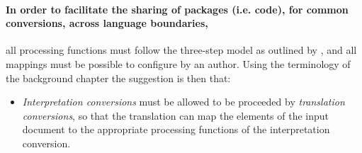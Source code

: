\documentclass{scrreprt}
\begin{document}
\paragraph{In order to facilitate the sharing of packages (i.e. code), for common conversions, across language boundaries, } all processing functions must follow the three-step model as outlined by \citet{goldfarb}, and all mappings must be possible to configure by an author. Using the terminology of the background chapter the suggestion is then that:

\begin{itemize}
\item \emph{Interpretation conversions} must be allowed to be proceeded by \emph{translation conversions}, so that the translation can map the elements of the input document to the appropriate processing functions of the interpretation conversion.
\end{itemize}





\end{document}

